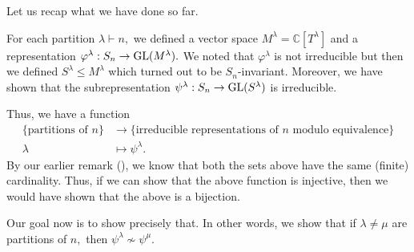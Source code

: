 \begin{aside}
	Let us recap what we have done so far.

	For each partition $\lambda \vdash n,$ we defined a vector space $M^\lambda = \mathbb{C}[T^\lambda]$ and a representation $\varphi^\lambda : S_n \to \operatorname{GL}(M^\lambda).$ We noted that $\varphi^\lambda$ is not irreducible but then we defined $S^\lambda \le M^\lambda$ which turned out to be $S_n$-invariant. Moreover, we have shown that the subrepresentation $\psi^\lambda : S_n \to \operatorname{GL}(S^\lambda)$ is irreducible.

	Thus, we have a function
	\begin{align*} 
		\{\text{partitions of } n\} &\to \{\text{irreducible representations of } n \text{ modulo equivalence}\}\\
		\lambda &\mapsto \psi^\lambda.
	\end{align*}
	By our earlier remark (), we know that both the sets above have the same (finite) cardinality. Thus, if we can show that the above function is injective, then we would have shown that the above is a bijection.

	Our goal now is to show precisely that. In other words, we show that if $\lambda \neq \mu$ are partitions of $n,$ then $\psi^\lambda \not\sim \psi^\mu.$
\end{aside}


